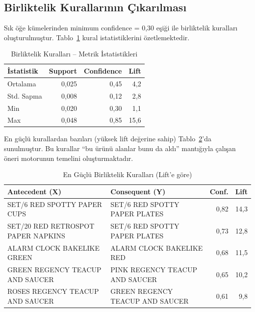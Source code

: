 \documentclass[conference]{IEEEtran}
\begin{document}
\subsection{Birliktelik Kurallarının Çıkarılması}

Sık öğe kümelerinden minimum confidence = 0,30 eşiği ile birliktelik kuralları oluşturulmuştur. Tablo~\ref{tab:rules_stats} kural istatistiklerini özetlemektedir.

\begin{table}[h]
\centering
\caption{Birliktelik Kuralları -- Metrik İstatistikleri}
\label{tab:rules_stats}
\begin{tabular}{lrrr}
\toprule
\textbf{İstatistik} & \textbf{Support} & \textbf{Confidence} & \textbf{Lift} \\
\midrule
Ortalama & 0,025 & 0,45 & 4,2 \\
Std. Sapma & 0,008 & 0,12 & 2,8 \\
Min & 0,020 & 0,30 & 1,1 \\
Max & 0,048 & 0,85 & 15,6 \\
\bottomrule
\end{tabular}
\end{table}

En güçlü kurallardan bazıları (yüksek lift değerine sahip) Tablo~\ref{tab:top_rules}'da sunulmuştur. Bu kurallar ``bu ürünü alanlar bunu da aldı'' mantığıyla çalışan öneri motorunun temelini oluşturmaktadır.

\begin{table}[h]
\centering
\caption{En Güçlü Birliktelik Kuralları (Lift'e göre)}
\label{tab:top_rules}
\begin{tabular}{p{2.5cm}p{2.5cm}rr}
\toprule
\textbf{Antecedent (X)} & \textbf{Consequent (Y)} & \textbf{Conf.} & \textbf{Lift} \\
\midrule
SET/6 RED SPOTTY PAPER CUPS & SET/6 RED SPOTTY PAPER PLATES & 0,82 & 14,3 \\
SET/20 RED RETROSPOT PAPER NAPKINS & SET/6 RED SPOTTY PAPER PLATES & 0,73 & 12,8 \\
ALARM CLOCK BAKELIKE GREEN & ALARM CLOCK BAKELIKE RED & 0,68 & 11,5 \\
GREEN REGENCY TEACUP AND SAUCER & PINK REGENCY TEACUP AND SAUCER & 0,65 & 10,2 \\
ROSES REGENCY TEACUP AND SAUCER & GREEN REGENCY TEACUP AND SAUCER & 0,61 & 9,8 \\
\bottomrule
\end{tabular}
\end{table}
\end{document}
